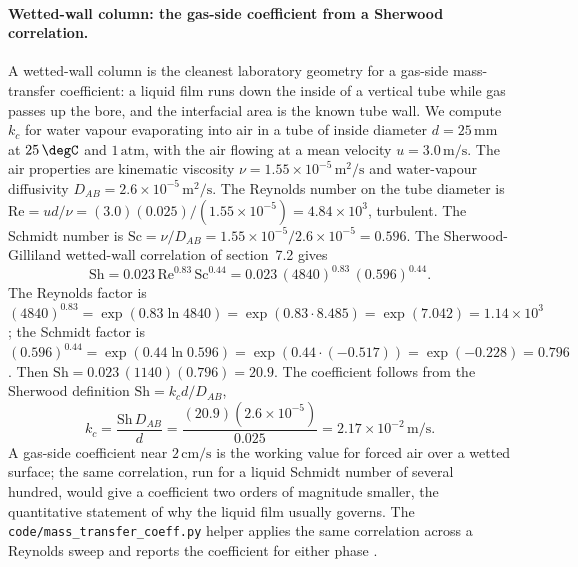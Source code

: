 \paragraph{Wetted-wall column: the gas-side coefficient from a Sherwood
correlation.} A wetted-wall column is the cleanest laboratory geometry
for a gas-side mass-transfer coefficient: a liquid film runs down the
inside of a vertical tube while gas passes up the bore, and the
interfacial area is the known tube wall. We compute $k_c$ for water
vapour evaporating into air in a tube of inside diameter $d =
25\,\si{\milli\meter}$ at $25\,\degC$ and $1\,\text{atm}$, with the air
flowing at a mean velocity $u = 3.0\,\text{m/s}$. The air properties are
kinematic viscosity $\nu = 1.55\times 10^{-5}\,\si{\meter\squared\per
\second}$ and water-vapour diffusivity $D_{AB} = 2.6\times 10^{-5}\,\si{
\meter\squared\per\second}$. The Reynolds number on the tube diameter is
$\text{Re} = ud/\nu = (3.0)(0.025)/(1.55\times 10^{-5}) = 4.84\times
10^{3}$, turbulent. The Schmidt number is $\text{Sc} = \nu/D_{AB} =
1.55\times 10^{-5}/2.6\times 10^{-5} = 0.596$. The Sherwood-Gilliland
wetted-wall correlation of section~7.2 gives
\[
\text{Sh} = 0.023\,\text{Re}^{0.83}\,\text{Sc}^{0.44} =
0.023\,(4840)^{0.83}\,(0.596)^{0.44}.
\]
The Reynolds factor is $(4840)^{0.83} = \exp(0.83\ln 4840) =
\exp(0.83\cdot 8.485) = \exp(7.042) = 1.14\times 10^{3}$; the Schmidt
factor is $(0.596)^{0.44} = \exp(0.44\ln 0.596) = \exp(0.44\cdot
(-0.517)) = \exp(-0.228) = 0.796$. Then $\text{Sh} = 0.023\,(1140)
(0.796) = 20.9$. The coefficient follows from the Sherwood definition
$\text{Sh} = k_c d/D_{AB}$,
\[
k_c = \frac{\text{Sh}\,D_{AB}}{d} = \frac{(20.9)(2.6\times 10^{-5})}
{0.025} = 2.17\times 10^{-2}\,\text{m/s}.
\]
A gas-side coefficient near $2\,\text{cm/s}$ is the working value for
forced air over a wetted surface; the same correlation, run for a liquid
Schmidt number of several hundred, would give a coefficient two orders of
magnitude smaller, the quantitative statement of why the liquid film
usually governs. The \texttt{code/mass\_transfer\_coeff.py} helper
applies the same correlation across a Reynolds sweep and reports the
coefficient for either phase \cite{text:bird-transport-phenomena}.

